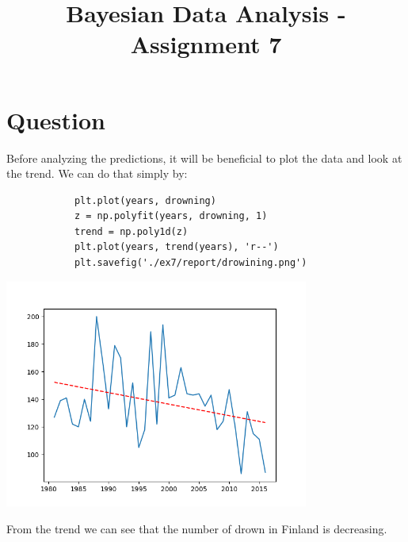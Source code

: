 \documentclass[11pt,a4paper,english]{article}
\title{Bayesian Data Analysis - Assignment 7}
\author{}
\begin{document}
        \maketitle

        \section{Question}
          Before analyzing the predictions, it will be beneficial to plot the data and look at the trend. We can do that simply by:
          \begin{verbatim}
            plt.plot(years, drowning)
            z = np.polyfit(years, drowning, 1)
            trend = np.poly1d(z)
            plt.plot(years, trend(years), 'r--')
            plt.savefig('./ex7/report/drowining.png')
          \end{verbatim}

          \begin{center}
            \includegraphics[width=10cm]{drowining.png}
          \end{center}

          From the trend we can see that the number of drown in Finland is decreasing.
\end{document}
